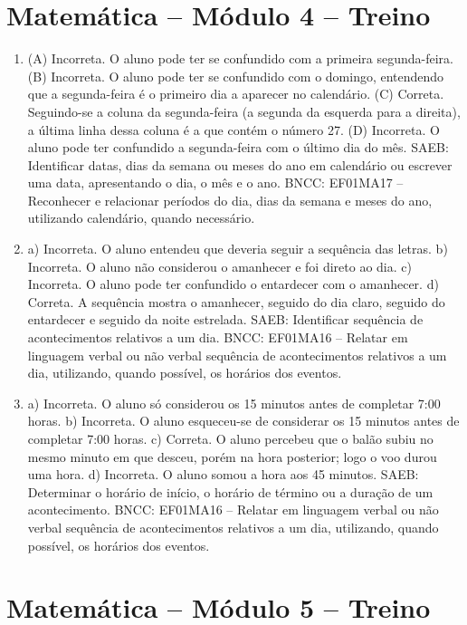\section*{Matemática – Módulo 4 – Treino}

\begin{enumerate}
\item
(A) Incorreta. O aluno pode ter se confundido com a primeira segunda-feira.
(B) Incorreta. O aluno pode ter se confundido com o domingo, entendendo que
a segunda-feira é o primeiro dia a aparecer no calendário.
(C) Correta. Seguindo-se a coluna da segunda-feira (a segunda da esquerda para a direita), a última linha dessa coluna é a que contém o número 27.
(D) Incorreta. O aluno pode ter confundido a segunda-feira com o último
dia do mês.
SAEB: Identificar datas, dias da semana ou meses do ano em
calendário ou escrever uma data, apresentando o dia, o mês e o ano.
BNCC: EF01MA17 -- Reconhecer e relacionar períodos do dia, dias da semana
e meses do ano, utilizando calendário, quando necessário.

\item
a) Incorreta. O aluno entendeu que deveria seguir a sequência das letras.
b) Incorreta. O aluno não considerou o amanhecer e foi direto ao dia.
c) Incorreta. O aluno pode ter confundido o entardecer com o amanhecer.
d) Correta. A sequência mostra o amanhecer, seguido do dia claro, seguido
do entardecer e seguido da noite estrelada.
SAEB: Identificar sequência de acontecimentos relativos a um dia.
BNCC: EF01MA16 -- Relatar em linguagem verbal ou não verbal sequência de
acontecimentos relativos a um dia, utilizando, quando possível, os
horários dos eventos.

\item
a) Incorreta. O aluno só considerou os 15 minutos antes de
completar 7:00 horas.
b) Incorreta. O aluno esqueceu-se de considerar os 15 minutos antes de
completar 7:00 horas.
c) Correta. O aluno percebeu que o balão subiu no mesmo minuto em
que desceu, porém na hora posterior; logo o voo durou uma hora.
d) Incorreta. O aluno somou a hora aos 45 minutos.
SAEB: Determinar o horário de início, o horário de término ou a
duração de um acontecimento.
BNCC: EF01MA16 -- Relatar em linguagem verbal ou não verbal sequência de
acontecimentos relativos a um dia, utilizando, quando possível, os
horários dos eventos.
\end{enumerate}

\section*{Matemática – Módulo 5 – Treino}

